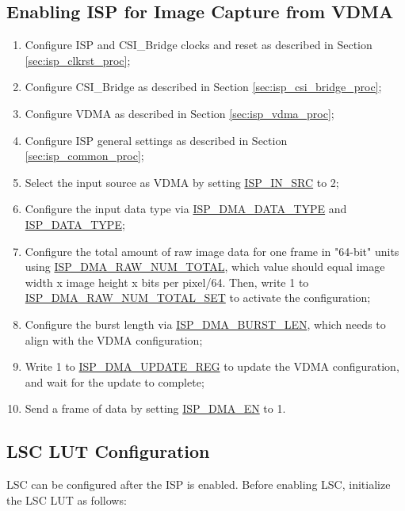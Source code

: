 \documentclass[main\_\_EN.tex]{subfiles}
\begin{document}
\subsection{Enabling ISP for Image Capture from VDMA}
\begin{enumerate}
    \item Configure ISP and CSI\_Bridge clocks and reset as described in Section \ref{sec:isp_clkrst_proc};

    \item Configure CSI\_Bridge as described in Section \ref{sec:isp_csi_bridge_proc};

    \item Configure VDMA as described in Section \ref{sec:isp_vdma_proc};

    \item Configure ISP general settings as described in Section \ref{sec:isp_common_proc};

    \item Select the input source as VDMA by setting \hyperref[fielddesc:ISPINSRC]{ISP\_IN\_SRC} to 2;

    \item Configure the input data type via \hyperref[fielddesc:ISPDMADATATYPE]{ISP\_DMA\_DATA\_TYPE} and \hyperref[fielddesc:ISPDATATYPE]{ISP\_DATA\_TYPE};

    \item Configure the total amount of raw image data for one frame in "64-bit" units using \hyperref[fielddesc:ISPDMARAWNUMTOTAL]{ISP\_DMA\_RAW\_NUM\_TOTAL}, which value should equal image width x image height x bits per pixel/64. Then, write 1 to \hyperref[fielddesc:ISPDMARAWNUMTOTALSET]{ISP\_DMA\_RAW\_NUM\_TOTAL\_SET} to activate the configuration;

    \item Configure the burst length via \hyperref[fielddesc:ISPDMABURSTLEN]{ISP\_DMA\_BURST\_LEN}, which needs to align with the VDMA configuration;

    \item Write 1 to \hyperref[fielddesc:ISPDMAUPDATEREG]{ISP\_DMA\_UPDATE\_REG} to update the VDMA configuration, and wait for the update to complete;

    \item Send a frame of data by setting \hyperref[fielddesc:ISPDMAEN]{ISP\_DMA\_EN} to 1.
\end{enumerate}


\subsection{LSC LUT Configuration}
LSC can be configured after the ISP is enabled. Before enabling LSC, initialize the LSC LUT as follows:
\end{document}
